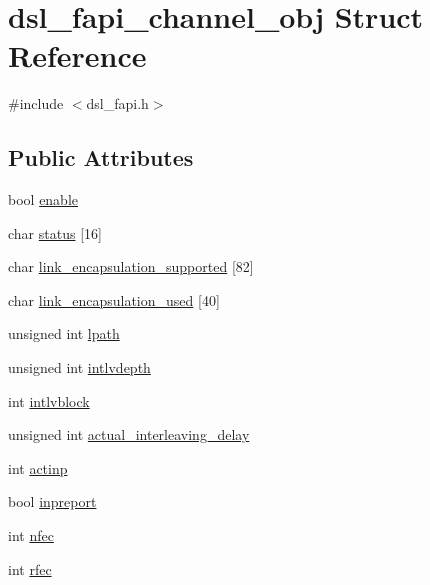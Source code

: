 \hypertarget{structdsl__fapi__channel__obj}{\section{dsl\-\_\-fapi\-\_\-channel\-\_\-obj Struct Reference}
\label{structdsl__fapi__channel__obj}
}


{\ttfamily \#include $<$dsl\-\_\-fapi.\-h$>$}

\subsection*{Public Attributes}
\begin{DoxyCompactItemize}
\item 
bool \hyperlink{structdsl__fapi__channel__obj_a092522adc02a3729ba22c4d564e253b9}{enable}
\item 
char \hyperlink{structdsl__fapi__channel__obj_a5769b6346cba4849ba38c2da2e99939f}{status} \mbox{[}16\mbox{]}
\item 
char \hyperlink{structdsl__fapi__channel__obj_a6f327970bafb74d20019e4c9f8351250}{link\-\_\-encapsulation\-\_\-supported} \mbox{[}82\mbox{]}
\item 
char \hyperlink{structdsl__fapi__channel__obj_a1d0d76c5a7a53c2e2553e546628ed85e}{link\-\_\-encapsulation\-\_\-used} \mbox{[}40\mbox{]}
\item 
unsigned int \hyperlink{structdsl__fapi__channel__obj_a29ec0882fb5449a659485d51f50b3b52}{lpath}
\item 
unsigned int \hyperlink{structdsl__fapi__channel__obj_afe9874cfeee95e864a6fc502d41200dd}{intlvdepth}
\item 
int \hyperlink{structdsl__fapi__channel__obj_aad9cd84951ffa3d57ee807b69ecd5f7a}{intlvblock}
\item 
unsigned int \hyperlink{structdsl__fapi__channel__obj_a3bae6d5253cf7ee22ea613847f42b68c}{actual\-\_\-interleaving\-\_\-delay}
\item 
int \hyperlink{structdsl__fapi__channel__obj_af95a0127772d8831b6fdd5e07dbf3964}{actinp}
\item 
bool \hyperlink{structdsl__fapi__channel__obj_ab6473968098d99af963b754467b7e17c}{inpreport}
\item 
int \hyperlink{structdsl__fapi__channel__obj_a16441831f8081dc4164f7a86dcccad96}{nfec}
\item 
int \hyperlink{structdsl__fapi__channel__obj_a077979a17ac2addeeb98f721201c74ce}{rfec}
\item 

\end{DoxyCompactItemize}
